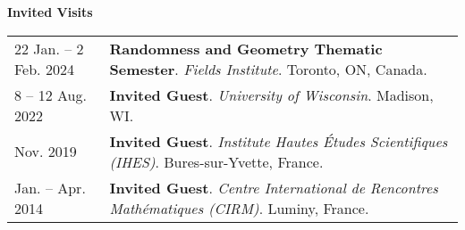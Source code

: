     \vspace{-1em}
    

    \textbf{\large Invited Visits}
    
    \begin{center}
    {
    \renewcommand{\arraystretch}{1.5}
    \begin{longtable}{p{}  p{}}
    22 Jan.  -- 2 Feb.  2024 & \textbf{Randomness and Geometry Thematic Semester}. \textit{Fields Institute}.  Toronto, ON, Canada.  \\ 
8  -- 12 Aug.  2022 & \textbf{Invited Guest}. \textit{University of Wisconsin}.  Madison, WI.  \\ 
 Nov.  2019 & \textbf{Invited Guest}. \textit{Institute Hautes \'Etudes Scientifiques (IHES)}.  Bures-sur-Yvette, France.  \\ 
 Jan.  --  Apr.  2014 & \textbf{Invited Guest}. \textit{Centre International de Rencontres Math\'ematiques (CIRM)}.  Luminy, France.  
    \end{longtable}
    } 
    \end{center}

    \vspace{-1em}
    